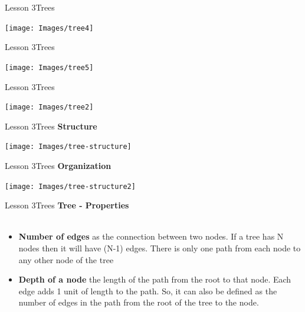 \documentclass[aspectratio=1610]{beamer}
\begin{document}
\begin{frame}{Lesson 3}{Trees}
\begin{center}
\texttt{[image: Images/tree4]}
\end{center}
\end{frame}


\begin{frame}{Lesson 3}{Trees}
\begin{center}
\texttt{[image: Images/tree5]}
\end{center}
\end{frame}


\begin{frame}{Lesson 3}{Trees}
\begin{center}
\texttt{[image: Images/tree2]}
\end{center}
\end{frame}


\begin{frame}{Lesson 3}{Trees}
\LARGE
\textbf{Structure}\\
\begin{center}
\texttt{[image: Images/tree-structure]}
\end{center}
\end{frame}


\begin{frame}{Lesson 3}{Trees}
\LARGE
\textbf{Organization}
\begin{center}
\texttt{[image: Images/tree-structure2]}
\end{center}
\end{frame}


\begin{frame}{Lesson 3}{Trees}
\LARGE
\textbf{Tree - Properties}\\~\\
\Large
\begin{itemize}
	\item \textbf{Number of edges} as the connection between two nodes. If a tree has N nodes then it will have (N-1) edges. There is only one path from each node to any other node of the tree
	\item \textbf{Depth of a node} the length of the path from the root to that node. Each edge adds 1 unit of length to the path. So, it can also be defined as the number of edges in the path from the root of the tree to the node.
\end{itemize}
\end{frame}
\end{document}
